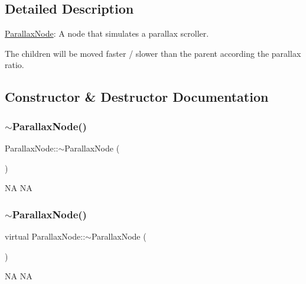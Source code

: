 \subsection{Detailed Description}
\hyperlink{classParallaxNode}{Parallax\+Node}\+: A node that simulates a parallax scroller. 

The children will be moved faster / slower than the parent according the parallax ratio. 

\subsection{Constructor \& Destructor Documentation}
\mbox{\label{classParallaxNode_a80996f705ea03234c98efaa769d6197b}} 
\subsubsection{\texorpdfstring{$\sim$\+Parallax\+Node()}{~ParallaxNode()}\hspace{0.1cm}{\footnotesize\ttfamily [1/2]}}
{\footnotesize\ttfamily Parallax\+Node\+::$\sim$\+Parallax\+Node (\begin{DoxyParamCaption}{ }\end{DoxyParamCaption})\hspace{0.3cm}{\ttfamily [virtual]}}

NA  NA \mbox{\label{classParallaxNode_abf74ce266f988b3efcc1331b23bb14d6}} 
\subsubsection{\texorpdfstring{$\sim$\+Parallax\+Node()}{~ParallaxNode()}\hspace{0.1cm}{\footnotesize\ttfamily [2/2]}}
{\footnotesize\ttfamily virtual Parallax\+Node\+::$\sim$\+Parallax\+Node (\begin{DoxyParamCaption}{ }\end{DoxyParamCaption})\hspace{0.3cm}{\ttfamily [virtual]}}

NA  NA 

